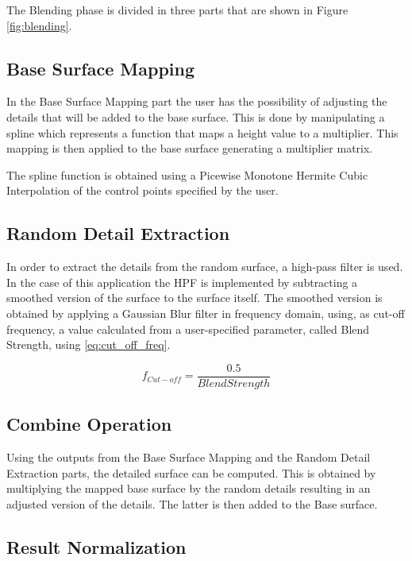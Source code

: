   The Blending phase is divided in three parts that are shown in Figure \ref{fig:blending}. 
  
  \subsection {Base Surface Mapping}
  
	In the Base Surface Mapping part the user has the possibility of adjusting the details that will be added to the base surface. This is done by manipulating a spline which represents a function that maps a height value to a multiplier. This mapping is then applied to the base surface generating a multiplier matrix.
	
	The spline function is obtained using a Picewise Monotone Hermite Cubic Interpolation of the control points specified by the user. 
    
  \subsection{Random Detail Extraction}

	In order to extract the details from the random surface, a high-pass filter is used. In the case of this application the HPF is implemented by subtracting a smoothed version of the surface to the surface itself. The smoothed version is obtained by applying a Gaussian Blur filter in frequency domain, using, as cut-off frequency, a value calculated from a user-specified parameter, called Blend Strength, using \ref{eq:cut_off_freq}.
	
	\begin{equation} \label{eq:cut_off_freq}
	  f_{Cut-off} = \frac{0.5}{BlendStrength}
	\end{equation}
	\myequation{}
      
  \subsection{Combine Operation}
  
    Using the outputs from the Base Surface Mapping and the Random Detail Extraction parts, the detailed surface can be computed. This is obtained by multiplying the mapped base surface by the random details resulting in an adjusted version of the details. The latter is then added to the Base surface.
      
  \subsection{Result Normalization}
  
